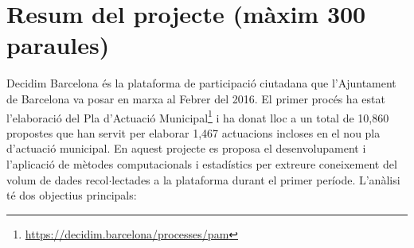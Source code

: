 \documentclass[final,10pt]{article}
\begin{document}
\section{Resum del projecte (m\`axim 300 paraules)}
%
% 
Decidim Barcelona \'es la plataforma de participaci\'o ciutadana que l'Ajuntament de Barcelona va posar en marxa al Febrer del 2016. El primer proc\'es ha estat l'elaboraci\'o del Pla d'Actuaci\'o Municipal\footnote{\url{https://decidim.barcelona/processes/pam}} i ha donat lloc a un total de 10,860 propostes que han servit per elaborar 1,467 actuacions incloses en el nou pla d'actuaci\'o municipal. En aquest projecte es proposa el desenvolupament i l'aplicaci\'o de m\`etodes computacionals i estad\'istics per extreure coneixement del volum de dades recol$\cdot$lectades a la plataforma durant el primer per\'iode. L'an\`alisi t\'e dos objectius principals:
\end{document}
